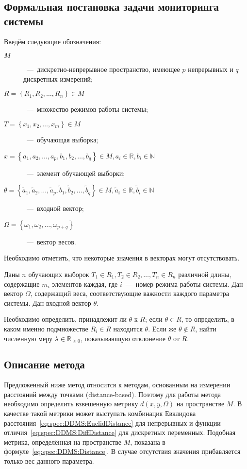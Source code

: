 \subsection{Формальная постановка задачи мониторинга системы}
\label{subsec:spec:DDMS:FormalTask}
Введём следующие обозначения:
\begin{description}
	\item[$M$]~---~дискретно-непрерывное пространство, имеющее $p$ непрерывных и $q$ дискретных измерений;
	\item[$R=\left\{R_1,R_2,\dots,R_n\right\} \in M$]~---~множество режимов работы системы;
	\item[$T=\left\{x_1,x_2,\dots,x_m\right\} \in M$]~---~обучающая выборка;
	\item[$x=\left\{a_1,a_2,\dots,a_p,b_1,b_2,\dots,b_q\right\} \in M, a_i\in\mathbb{R}, b_i\in\mathbb{N}$]~---~элемент обучающей выборки;
	\item[$\theta=\left\{\tilde{a}_1,\tilde{a}_2,\dots,\tilde{a}_p,\tilde{b}_1,\tilde{b}_2,\dots,\tilde{b}_q\right\} \in M, \tilde{a}_i\in\mathbb{R}, \tilde{b}_i\in\mathbb{N}$]~---~входной вектор;
	\item[$\Omega=\left\{\omega_1,\omega_2,\dots,\omega_{p+q}\right\}$]~---~вектор весов.
\end{description}

Необходимо отметить, что некоторые значения в векторах могут отсутствовать.

Даны $n$ обучающих выборок $T_1\in R_1, T_2\in R_2,\dots, T_n\in R_n$ различной длины, содержащие $m_i$ элементов каждая, где $i$~---~номер режима работы системы. Дан вектор $\Omega$, содержащий веса, соответствующие важности каждого параметра системы. Дан входной вектор $\theta$.

Необходимо определить, принадлежит ли $\theta$ к $R$; если $\theta \in R$, то определить, в каком именно подмножестве $R_i\in R$ находится $\theta$. Если же $\theta \notin R$, найти численную меру $\lambda \in \mathbb{R}_{\geq 0}$, показывающую отклонение $\theta$ от $R$.

\subsection{Описание метода}
Предложенный ниже метод относится к методам, основанным на измерении расстояний между точками (distance-based). Поэтому для работы метода необходимо определить взвешенную метрику $d(x,y,\Omega)$ на пространстве $M$. В качестве такой метрики может выступать комбинация Евклидова расстояния~\eqref{eq:spec:DDMS:EuclidDistance} для непрерывных и функции отличия~\eqref{eq:spec:DDMS:DiffDistance} для дискретных переменных. Подобная метрика, определённая на пространстве $M$, показана в формуле~\eqref{eq:spec:DDMS:Distance}. В случае отсутствия значения прибавляется только вес данного параметра.

